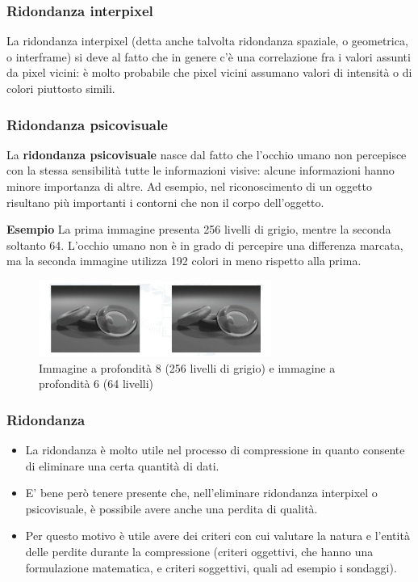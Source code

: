 \subsubsection{Ridondanza interpixel}
La ridondanza interpixel (detta anche talvolta ridondanza spaziale, o geometrica, o interframe) si deve al fatto che in genere c'è una correlazione fra i valori assunti da pixel vicini:
è molto probabile che pixel vicini assumano valori di intensità o di colori piuttosto simili.

\subsubsection{Ridondanza psicovisuale}
La \textbf{ridondanza psicovisuale} nasce dal fatto che l'occhio umano non percepisce con la stessa sensibilità tutte le informazioni visive: alcune informazioni hanno minore importanza di altre.
Ad esempio, nel riconoscimento di un oggetto risultano più importanti i contorni che non il corpo dell'oggetto.

\textbf{Esempio}
La prima immagine presenta 256 livelli di grigio, mentre la seconda soltanto 64.
L'occhio umano non è in grado di percepire una differenza marcata, ma la seconda immagine utilizza
192 colori in meno rispetto alla prima.

\begin{figure}[H]
    \centering
    \includegraphics[width=\linewidth, keepaspectratio]{capitoli/immagini/imgs/ridondanza-psicovisuale.png}
    \caption{Immagine a profondità 8 (256 livelli di grigio) e immagine a
        profondità 6 (64 livelli)}
\end{figure}

\subsubsection{Ridondanza}
\begin{itemize}
    \item La ridondanza è molto utile nel processo di compressione in
          quanto consente di eliminare una certa quantità di dati.
    \item E' bene però tenere presente che, nell'eliminare ridondanza
          interpixel o psicovisuale, è possibile avere anche una perdita di
          qualità.
    \item Per questo motivo è utile avere dei criteri con cui valutare la
          natura e l'entità delle perdite durante la compressione (criteri
          oggettivi, che hanno una formulazione matematica, e criteri soggettivi, quali ad esempio i sondaggi).
\end{itemize}

